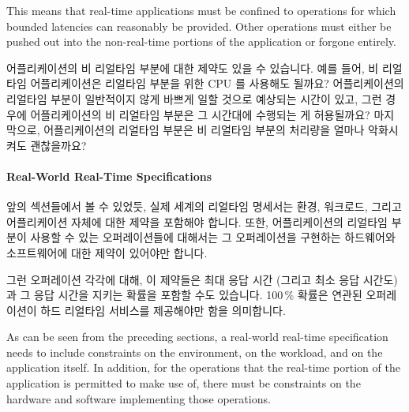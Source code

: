 This means that real-time applications must be confined to operations
for which bounded latencies can reasonably be provided.
Other operations must either be pushed out into the non-real-time portions
of the application or forgone entirely.

\fi

어플리케이션의 비 리얼타임 부분에 대한 제약도 있을 수 있습니다.
예를 들어, 비 리얼타임 어플리케이션은 리얼타임 부분을 위한 CPU 를 사용해도
될까요?
어플리케이션의 리얼타임 부분이 일반적이지 않게 바쁘게 일할 것으로 예상되는
시간이 있고, 그런 경우에 어플리케이션의 비 리얼타임 부분은 그 시간대에 수행되는
게 허용될까요?
마지막으로, 어플리케이션의 리얼타임 부분은 비 리얼타임 부분의 처리량을 얼마나
악화시켜도 괜찮을까요?

\paragraph{Real-World Real-Time Specifications}
\label{sec:advsync:Real-World Real-Time Specifications}

앞의 섹션들에서 볼 수 있었듯, 실제 세계의 리얼타임 명세서는 환경, 워크로드,
그리고 어플리케이션 자체에 대한 제약을 포함해야 합니다.
또한, 어플리케이션의 리얼타임 부분이 사용할 수 있는 오퍼레이션들에 대해서는 그
오퍼레이션을 구현하는 하드웨어와 소프트웨어에 대한 제약이 있어야만 합니다.

그런 오퍼레이션 각각에 대해, 이 제약들은 최대 응답 시간 (그리고 최소 응답
시간도) 과 그 응답 시간을 지키는 확률을 포함할 수도 있습니다.
100\,\% 확률은 연관된 오퍼레이션이 하드 리얼타임 서비스를 제공해야만 함을
의미합니다.

\iffalse

As can be seen from the preceding sections, a real-world real-time
specification needs to include constraints on the environment,
on the workload, and on the application itself.
In addition, for the operations that the real-time portion of the
application is permitted to make use of, there must be constraints
on the hardware and software implementing those operations.

